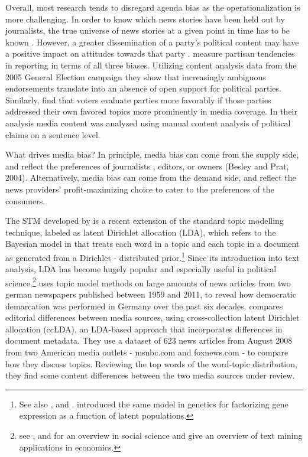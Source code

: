 \documentclass[12pt,a4paper,notitlepage]{article}
\begin{document}
Overall, most research tends to disregard agenda bias as the operationalization is more challenging. In order to know which news stories have been held out by journalists, the true universe of news stories at a given point in time has to be known \citet{dalessio_media_2000}. However, a greater dissemination of a party's political content may have a positive impact on attitudes towards that party \citep{benewick_floating_1969, eberl_one_2017}. \citet{brandenburg_party_2006} measure partisan tendencies in reporting in terms of all three biases. Utilizing content analysis data from the 2005 General Election campaign they show that increasingly ambiguous endorsements translate into an absence of open support for political parties. Similarly, \citet{eberl_one_2017} find that voters evaluate parties more favorably if those parties addressed their own favored topics more prominently in media coverage. In their analysis media content was analyzed using manual content analysis of political claims on a sentence level.

What drives media bias?
In principle, media bias can come from the supply side, and reflect the preferences of journalists \citep{baron_persistent_2006}, editors, or owners (Besley and Prat, 2004). Alternatively, media bias can come from the demand side, and reflect the news providers' profit-maximizing choice to cater to the preferences of the consumers.

The STM developed by \citet{roberts_model_2016} is a recent extension of the standard topic modelling technique, labeled as latent Dirichlet allocation (LDA), which refers to the Bayesian model in \citet{blei_latent_2003} that treats each word in a topic and each topic in a document as generated from a Dirichlet - distributed prior.\footnote{See also \citet{griffiths_probabilistic_2002}, \citet{griffiths_finding_2004} and \citet{hofmann_probabilistic_1999}. \citet{pritchard_inference_2000} introduced the same model in genetics for factorizing gene expression as a function of latent populations.} Since its introduction into text analysis, LDA has become hugely popular and especially useful in political science.\footnote{see \citet{blei_probabilistic_2012}, \citet{grimmer_text_2013} and \citet{wiedmann_text_2016} for an overview in social science and \citet{gentzkow_text_2017} give an overview of text mining applications in economics.} \citet{wiedmann_text_2016} uses topic model methods on large amounts of news articles from two german newspapers published between 1959 and 2011, to reveal how democratic demarcation was performed in Germany over the past six decades. \citet{paul_cross-collection_2009} compares editorial differences between media sources, using cross-collection latent Dirichlet allocation (ccLDA), an LDA-based approach that incorporates differences in document metadata. They use a dataset of 623 news articles from August 2008 from two American media outlets - msnbc.com and foxnews.com - to compare how they discuss topics. Reviewing the top words of the word-topic distribution, they find some content differences between the two media sources under review. 
\end{document}

